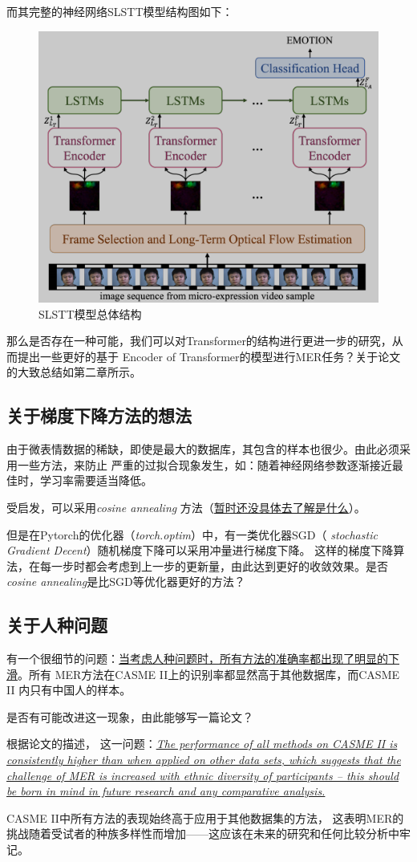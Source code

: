 \documentclass[AutoFakeBold]{MyFormat}
\begin{document}
\par 而其完整的神经网络SLSTT模型结构图如下：
\begin{figure}[!h]
    \centering
    \includegraphics[width=0.6\linewidth]{figures/MyReflections/2.png}
    \caption{SLSTT模型总体结构}
\end{figure}
\par 那么是否存在一种可能，我们可以对Transformer的结构进行更进一步的研究，从而提出一些更好的基于
Encoder of Transformer的模型进行MER任务？关于论文的大致总结如第二章所示。



\subsection{关于梯度下降方法的想法}
\par 由于微表情数据的稀缺，即使是最大的数据库，其包含的样本也很少。由此必须采用一些方法，来防止
严重的过拟合现象发生，如：随着神经网络参数逐渐接近最佳时，学习率需要适当降低。
\par 受启发，可以采用\textit{cosine annealing}
方法（\underline{暂时还没具体去了解是什么}）。
\par 但是在Pytorch的优化器（\textit{torch.optim}）中，有一类优化器SGD（
\textit{stochastic Gradient Decent}）随机梯度下降可以采用冲量进行梯度下降。
这样的梯度下降算法，在每一步时都会考虑到上一步的更新量，由此达到更好的收敛效果。是否
\textit{cosine annealing}是比SGD等优化器更好的方法？


\subsection{关于人种问题}
\par 有一个很细节的问题：\underline{当考虑人种问题时，所有方法的准确率都出现了明显的下滑}。所有
MER方法在CASME II上的识别率都显然高于其他数据库，而CASME II
内只有中国人的样本。\
\par 是否有可能改进这一现象，由此能够写一篇论文？
\par 根据论文的描述，
这一问题：\textit{\uline{The performance of all methods 
on CASME II is consistently higher than when applied on other data sets, 
which suggests that the challenge of MER is increased with ethnic diversity of 
participants – this should be born in mind in future research and any comparative analysis.}}
\par CASME II中所有方法的表现始终高于应用于其他数据集的方法，
这表明MER的挑战随着受试者的种族多样性而增加——这应该在未来的研究和任何比较分析中牢记。
\end{document}
